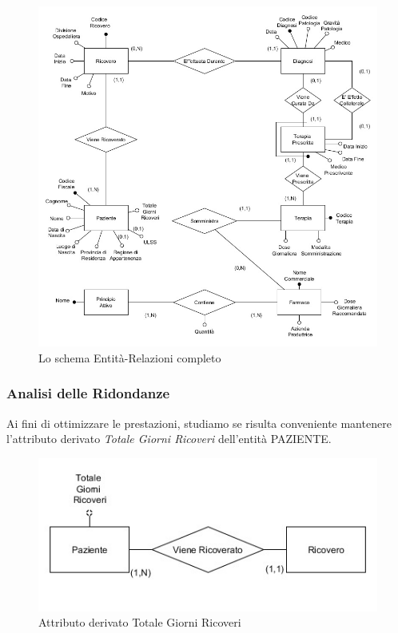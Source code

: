 \documentclass{article}
\begin{document}
\begin{figure}[H] %
	\centering
	\includegraphics[width=\linewidth]{schema2}
	\caption{Lo schema Entità-Relazioni completo}
  \label{fig:ER_ristrutturato}
\end{figure}

\clearpage



\subsubsection{Analisi delle Ridondanze}

Ai fini di ottimizzare le prestazioni, studiamo se risulta conveniente mantenere l'attributo derivato \textit{Totale Giorni Ricoveri} dell'entità PAZIENTE.

\begin{figure}[H] %
	\centering
	\includegraphics[width=\linewidth]{totalegiorni}
	\caption{Attributo derivato Totale Giorni Ricoveri}
	\label{fig:attributo-ridondante}
\end{figure}
\end{document}
